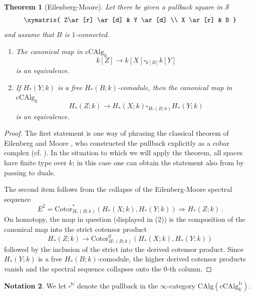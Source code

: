 \documentclass[oneside, a4paper, 12pt]{article}
\numberwithin{equation}{section}
\newcommand{\CAlg}{\mathrm{CAlg}}
\newcommand{\cCAlg}{\mathrm{cCAlg}}
\newcommand{\N}{\mathbb{N}}
\theoremstyle{plain}
\newtheorem{theorem}{Theorem}[section]
\theoremstyle{definition}
\newtheorem{notation}[theorem]{Notation}
\theoremstyle{remark}
\begin{document}
\begin{theorem}[Eilenberg-Moore] \label{thm:em}
Let there be given a pullback square in $\mathcal{S}$
\[
\xymatrix{
Z\ar[r] \ar[d] & Y \ar[d] \\
X \ar[r] & B
}
\]
and assume that $B$ is $1$-connected. 
\begin{enumerate}
\item[(1)] The canonical map in $\cCAlg_k$
\[
k[Z] \to k[X]\square_{k[B]} k[Y]
\]
is an equivalence.
\item[(2)] If $H_\ast(Y;k)$ is a free $H_\ast(B;k)$-comodule, then the canonical map in $\cCAlg_k$
\[
H_\ast(Z;k) \to H_\ast(X;k) \square_{H_\ast(B;k)} H_\ast(Y;k)
\]
is an equivalence.
\end{enumerate}
\end{theorem}
\begin{proof}
The first statement is one way of phrasing the classical theorem of Eilenberg and Moore \cite{EM}, who constructed the pullback explicitly as a cobar complex (cf. \cite[Section 5.2.2]{HA}). In the situation to which we will apply the theorem, all spaces have finite type over $k$; in this case one can obtain the statement also from \cite[Corollary 1.1.10]{DAGXIII} by passing to duals.

The second item follows from the collapse of the Eilenberg-Moore spectral sequence
\[
E^2=\mathrm{Cotor}^\ast_{H_\ast(B;k)}(H_\ast(X;k),H_\ast(Y;k)) \Longrightarrow H_\ast(Z;k)\, .
\]
On homotopy, the map in question (displayed in (2)) is the composition of the canonical map into the strict cotensor product
\[
H_\ast(Z;k) \to \mathrm{Cotor}^0_{H_\ast(B;k)}(H_\ast(X;k),H_\ast(Y;k))
\]
followed by the inclusion of the strict into the derived cotensor product. Since $H_\ast(Y;k)$ is a free $H_\ast(B;k)$-comodule, the higher derived cotensor products vanish and the spectral sequence collapses onto the $0$-th column.
\end{proof}

\begin{notation}
We let $\square^\N$ denote the pullback in the $\infty$-category $\CAlg(\cCAlg_k^\N)$.
\end{notation}
\end{document}
